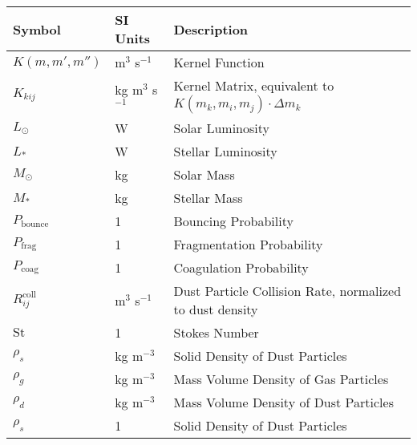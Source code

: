     \begin{table}[h!]
        \begin{tabular}{|l|l|l|}
            \hline
            \textbf{Symbol}     & \textbf{SI Units}     & \textbf{Description}
            \\ \hline
            $K(m,m',m'')$      & m$^3$ s$^{-1}$        & Kernel Function
            \\ \hline
            $K_{kij}$           & kg m$^3$ s$^{-1}$     & Kernel Matrix, equivalent to 
                                                          $K(m_k,m_i,m_j) \cdot \Delta m_k$
            \\ \hline
            $L_\odot$           & W                     & Solar Luminosity 
            \\ \hline
            $L_*$               & W                     & Stellar Luminosity 
            \\ \hline
            $M_\odot$           & kg                    & Solar Mass 
            \\ \hline
            $M_*$               & kg                    & Stellar Mass 
            \\ \hline
            $P_\text{bounce}$   & 1                     & Bouncing Probability
            \\ \hline
            $P_\text{frag}$     & 1                     & Fragmentation Probability
            \\ \hline
            $P_\text{coag}$     & 1                     & Coagulation Probability
            \\ \hline
            $R^\text{coll}_{ij}$& m$^3$ s$^{-1}$        & Dust Particle Collision Rate,
                                                          normalized to dust density
            \\ \hline
            $\text{St}$         & 1                     & Stokes Number 
            \\ \hline
            $\rho_s$            & kg m$^{-3}$           & Solid Density of Dust Particles 
            \\ \hline
            $\rho_g$            & kg m$^{-3}$           & Mass Volume Density of Gas Particles 
            \\ \hline
            $\rho_d$            & kg m$^{-3}$           & Mass Volume Density of Dust Particles 
            \\ \hline
            $\rho_s$            & 1                     & Solid Density of Dust Particles 

\end{tabular}
\end{table}
